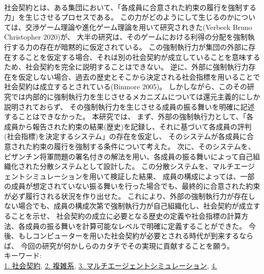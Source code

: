 
~ \\
  社会契約とは、ある集団において、「各成員に合意された約束の履行を強制する力」を生じさせるプロセスである。
  この力がどのようにして生じるのかについては、交渉ゲーム理論や進化ゲーム理論を用いて研究されきた(Verbeek Bruno Christopher 2020)\cite{Verbeek Bruno Christopher 2020}が、
  大半の研究は、そのゲームにおける利得の分配を強制執行する力の存在が暗黙的に仮定されている。
  この強制執行力が集団の外部に存在することを仮定する場合、それは別の社会契約が成立していることを意味するため、社会契約を完全に説明することはできない。
  逆に、外部に強制執行力存在を仮定しない場合、過去の歴史とそこから決定される社会指標を用いることで社会契約は成立するとされている(Binmore 2005)。
  しかしながら、このその研究では内部的に強制執行力を生じさせるメカニズムについては還元主義的にしか説明されておらず、
  その強制執行力を生じさせる成員の振る舞いを明確に記述することはできなかった。
  本研究では、
  まず、外部の強制執行力として、「各成員から報告された約束の結果(歴史)を記録し、それに基づいて各成員の評判(社会指標)を決定するシステム」の存在を仮定し、
  そのシステムが各成員に合意された約束の履行を強制する条件について考えた。
  次に、そのシステムを、ビザンチン将軍問題の署名付きの解法を用い、各成員の振る舞いによって自己組織化された分散システムとして設計した。
  この分散システムを、マルチエージェントシミュレーションを用いて検証した結果、
  成員の構成によっては、一部の成員が想定されていない振る舞いを行った場合でも、最終的に合意された約束が必ず履行される状況を作り出せた。
  これにより、外部の強制執行力が存在しない場合でも、成員の構成次第で強制執行力が自己組織化し、社会契約が成立することを示せ、
  社会契約の成立に必要となる歴史の定義や社会指標の計算方法、各成員の振る舞いを計算可能なレベルで明確に定義することができた。
  今後、もしコンピューターを用いた社会契約が必要とされる時代が到来するならば、
  今回の研究が何かしらのカタチでその実現に貢献することを願う。
~ \\
キーワード:\\
\underline{1. 社会契約},
\underline{2. 複雑系},
\underline{3. マルチエージェントシミュレーション},
\underline{4. }
\begin{flushright}
\dept \\
\author
\end{flushright}
